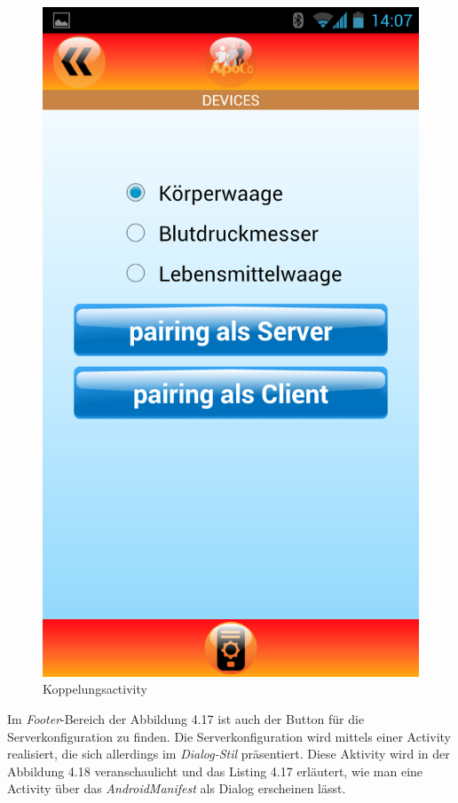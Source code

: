 \begin{figure}[h]
  \centering
  \includegraphics[scale=0.2]{screenshots/kapitel4/pairing.png}
  \caption{Koppelungsactivity}
  
\end{figure}

Im \emph{Footer}-Bereich der Abbildung 4.17 ist auch der Button f\"ur die Serverkonfiguration zu finden.
Die Serverkonfiguration wird mittels einer Activity realisiert, die sich allerdings im \emph{Dialog-Stil} pr\"asentiert.
Diese Aktivity wird in der Abbildung 4.18 veranschaulicht und das Listing 4.17 erl\"autert, 
wie man eine Activity \"uber das \emph{AndroidManifest} als Dialog erscheinen l\"asst.\\

